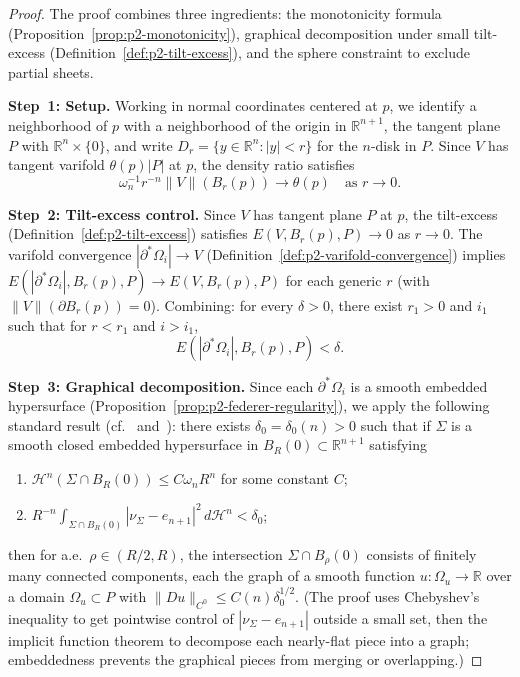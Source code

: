 \begin{proof}
The proof combines three ingredients: the monotonicity formula (Proposition~\ref{prop:p2-monotonicity}), graphical decomposition under small tilt-excess (Definition~\ref{def:p2-tilt-excess}), and the sphere constraint to exclude partial sheets.

\medskip\noindent\textbf{Step~1: Setup.}
Working in normal coordinates centered at $p$, we identify a neighborhood of $p$ with a neighborhood of the origin in $\mathbb{R}^{n+1}$, the tangent plane $P$ with $\mathbb{R}^n \times \{0\}$, and write $D_r = \{y \in \mathbb{R}^n : |y| < r\}$ for the $n$-disk in $P$. Since $V$ has tangent varifold $\theta(p)|P|$ at $p$, the density ratio satisfies
\[
    \omega_n^{-1} r^{-n} \|V\|(B_r(p)) \to \theta(p) \quad \text{as } r \to 0.
\]

\medskip\noindent\textbf{Step~2: Tilt-excess control.}
Since $V$ has tangent plane $P$ at $p$, the tilt-excess (Definition~\ref{def:p2-tilt-excess}) satisfies $E(V, B_r(p), P) \to 0$ as $r \to 0$. The varifold convergence $|\partial^*\Omega_i| \to V$ (Definition~\ref{def:p2-varifold-convergence}) implies $E(|\partial^*\Omega_i|, B_r(p), P) \to E(V, B_r(p), P)$ for each generic $r$ (with $\|V\|(\partial B_r(p)) = 0$). Combining: for every $\delta > 0$, there exist $r_1 > 0$ and $i_1$ such that for $r < r_1$ and $i > i_1$,
\[
    E(|\partial^*\Omega_i|, B_r(p), P) < \delta.
\]

\medskip\noindent\textbf{Step~3: Graphical decomposition.}
Since each $\partial^*\Omega_i$ is a smooth embedded hypersurface (Proposition~\ref{prop:p2-federer-regularity}), we apply the following standard result (cf.~\cite[Chapter~7]{Sim84} and~\cite[Lemma~2.1]{Wic14}): there exists $\delta_0 = \delta_0(n) > 0$ such that if $\Sigma$ is a smooth closed embedded hypersurface in $B_R(0) \subset \mathbb{R}^{n+1}$ satisfying
\begin{enumerate}[label=\textup{(H\arabic*)}]
    \item $\mathcal{H}^n(\Sigma \cap B_R(0)) \leq C \omega_n R^n$ for some constant $C$;
    \item $R^{-n} \int_{\Sigma \cap B_R(0)} |\nu_\Sigma - e_{n+1}|^2 \, d\mathcal{H}^n < \delta_0$;
\end{enumerate}
then for a.e.\ $\rho \in (R/2, R)$, the intersection $\Sigma \cap B_\rho(0)$ consists of finitely many connected components, each the graph of a smooth function $u \colon \Omega_u \to \mathbb{R}$ over a domain $\Omega_u \subset P$ with $\|Du\|_{C^0} \leq C(n)\delta_0^{1/2}$. (The proof uses Chebyshev's inequality to get pointwise control of $|\nu_\Sigma - e_{n+1}|$ outside a small set, then the implicit function theorem to decompose each nearly-flat piece into a graph; embeddedness prevents the graphical pieces from merging or overlapping.)


\end{proof}
